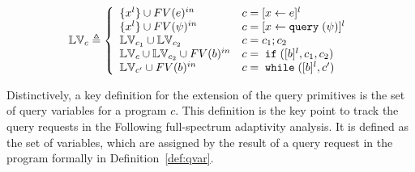 \begin{defn}
\label{def:lvar}
$$
  \lvar_{c} \triangleq
  \left\{
  \begin{array}{ll}
      \{{x}^l\} \cup FV(\expr)^{in}                  
      & {c} = [{\assign x e}]^{l} 
      \\
      \{{x}^l\}   \cup FV(\qexpr)^{in}                
      & {c} = [{\assign x \query(\qexpr)}]^{l} 
      \\
      \lvar_{{c_1}} \cup \lvar_{{c_2}}  
      & {c} = {c_1};{c_2}
      \\
      \lvar_{{c}} \cup \lvar_{{c_2}} \cup FV(\bexpr)^{in}
      & {c} =\eif([\bexpr]^{l}, c_1, c_2) 
      \\
      \lvar_{{c}'} \cup FV(\bexpr)^{in}
      & {c}   = \ewhile ([\bexpr]^{l}, {c}')
\end{array}
\right.
$$
\end{defn}
%
%
%
Distinctively, a key definition for the extension of the query primitives 
is the set of query variables for a program $c$.
This definition is the key point to track the query requests in the Following full-spectrum adaptivity analysis.
It is defined as the set of variables,
which are assigned by the result of a query request in the program formally in Definition~\ref{def:qvar}.
%
